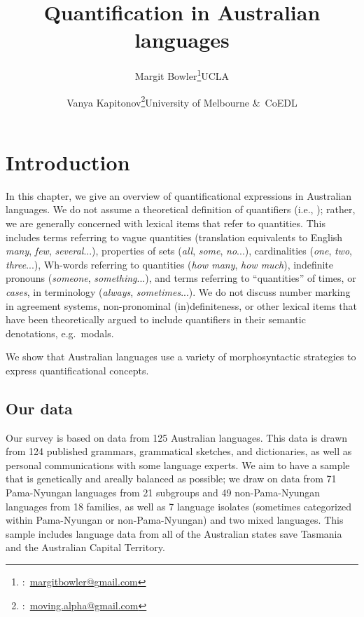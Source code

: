 \documentclass[12pt,egregdoesnotlikesansseriftitles]{scrartcl}
\title{Quantification in Australian languages}
\author{Margit Bowler\thanks{\Letter:~\href{mailto:margitbowler@gmail.com}{margitbowler@gmail.com}}\authorcr UCLA \and \vspace{-.5cm}Vanya Kapitonov\thanks{\Letter:~\href{mailto:moving.alpha@gmail.com}{moving.alpha@gmail.com}}\authorcr University of Melbourne \&\ CoEDL}
\begin{document}
\maketitle

\section{Introduction}

In this chapter, we give an overview of quantificational expressions in Australian languages. We do not assume a theoretical definition of quantifiers (i.e., \citealt{heimkratzer98}); rather, we are generally concerned with lexical items that refer to quantities. This includes terms referring to vague quantities (translation equivalents to English \textit{many}, \textit{few}, \textit{several}...), properties of sets (\textit{all}, \textit{some}, \textit{no}...), cardinalities (\textit{one}, \textit{two}, \textit{three}...), Wh-words referring to quantities (\textit{how many}, \textit{how much}), indefinite pronouns (\textit{someone}, \textit{something}...), and terms referring to ``quantities'' of times, or \textit{cases}, in  terminology (\textit{always}, \textit{sometimes}...). We do not discuss number marking in agreement systems, non-pronominal (in)definiteness, or other lexical items that have been theoretically argued to include quantifiers in their semantic denotations, e.g.\ modals.

We show that Australian languages use a variety of morphosyntactic strategies to express quantificational concepts.

\subsection{Our data}


Our survey is based on data from 125 Australian languages. This data is drawn from 124 published grammars, grammatical sketches, and dictionaries, as well as personal communications with some language experts. We aim to have a sample that is genetically and areally balanced as possible; we draw on data from 71 Pama-Nyungan languages from 21 subgroups and 49 non-Pama-Nyungan languages from 18 families, as well as 7 language isolates (sometimes categorized within Pama-Nyungan or non-Pama-Nyungan) and two mixed languages. This sample includes language data from all of the Australian states save Tasmania and the Australian Capital Territory.
\end{document}
